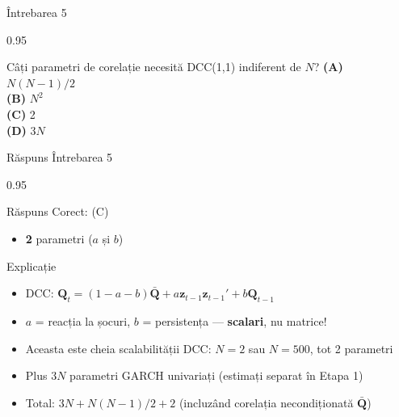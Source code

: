 \documentclass[9pt, aspectratio=169, t]{beamer}
\begin{document}
\begin{frame}{Întrebarea 5}
    \begin{cminipage}{0.95\textwidth}
    \begin{block}{Câți parametri de corelație necesită DCC(1,1) indiferent de $N$?}
        \textcolor{MainBlue}{\textbf{(A)}} $N(N-1)/2$\\[3pt]
        \textcolor{MainBlue}{\textbf{(B)}} $N^2$\\[3pt]
        \textcolor{MainBlue}{\textbf{(C)}} 2\\[3pt]
        \textcolor{MainBlue}{\textbf{(D)}} $3N$
    \end{block}
    \end{cminipage}
\end{frame}

\begin{frame}{Răspuns Întrebarea 5}
    \begin{cminipage}{0.95\textwidth}
    \begin{exampleblock}{Răspuns Corect: (C)}
        \begin{itemize}\setlength{\itemsep}{0pt}
            \item \textbf{2} parametri ($a$ și $b$)
        \end{itemize}
    \end{exampleblock}

    \pause
    \begin{block}{Explicație}
        \begin{itemize}\setlength{\itemsep}{0pt}
            \item DCC: $\mathbf{Q}_t = (1-a-b)\bar{\mathbf{Q}} + a\mathbf{z}_{t-1}\mathbf{z}_{t-1}' + b\mathbf{Q}_{t-1}$
            \item $a$ = reacția la șocuri, $b$ = persistența --- \textbf{scalari}, nu matrice!
            \item Aceasta este cheia scalabilității DCC: $N = 2$ sau $N = 500$, tot 2 parametri
            \item Plus $3N$ parametri GARCH univariați (estimați separat în Etapa 1)
            \item Total: $3N + N(N-1)/2 + 2$ (incluzând corelația necondiționată $\bar{\mathbf{Q}}$)
        \end{itemize}
    \end{block}
    \end{cminipage}
\end{frame}
\end{document}
